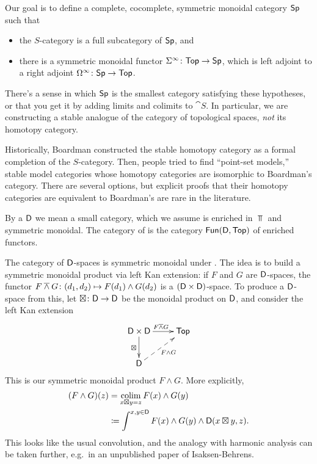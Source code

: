 Our goal is to define a complete, cocomplete, symmetric monoidal category $\mathsf{Sp}$ such that
\begin{itemize}
	\item the $S$-category is a full subcategory of $\mathsf{Sp}$, and
	\item there is a symmetric monoidal functor $\Sigma^\infty\colon\mathsf{Top}\to\mathsf{Sp}$, which is left adjoint to a right
	adjoint $\Omega^\infty\colon\mathsf{Sp}\to\mathsf{Top}$.
\end{itemize}
There's a sense in which $\mathsf{Sp}$ is the smallest category satisfying these hypotheses, or that you get it by adding
limits and colimits to $\cat S$. In particular, we are constructing a stable analogue of the category of
topological spaces, \emph{not} its homotopy category.
\begin{rem}
Historically, Boardman constructed the stable homotopy category as a formal completion of the $S$-category. Then,
people tried to find ``point-set models,'' stable model categories whose homotopy categories are isomorphic to
Boardman's category. There are several options, but explicit proofs that their homotopy categories are equivalent to
Boardman's are rare in the literature.
\end{rem}
\begin{defn}
By a  $\mathsf D$ we mean a small category, which we assume is enriched in $\Top$ and symmetric monoidal.
The category of  is the category $\mathsf{Fun}(\mathsf D,\mathsf{Top})$ of enriched functors.
\end{defn}
The category of $\mathsf D$-spaces is symmetric monoidal under . The idea is to build a symmetric
monoidal product via left Kan extension: if $F$ and $G$ are $\mathsf D$-spaces, the functor $F\overwedge
G\colon(d_1,d_2)\mapsto F(d_1)\wedge G(d_2)$ is a $(\mathsf D\times\mathsf D)$-space. To produce a $\mathsf D$-space from this, let
$\boxtimes\colon\mathsf D\to\mathsf D$ be the monoidal product on $\mathsf D$, and consider the left Kan extension
\[\xymatrix{
	\fD\times\fD\ar[r]^{F\overwedge G}\ar[d]_\boxtimes & \Top\\
	\fD\ar@{-->}[ur]_{F\wedge G}
}\]
This is our symmetric monoidal product $F\wedge G$. More explicitly,
\begin{align*}
( F\wedge G)(z) &= \operatorname*{colim}_{x\boxtimes y = z} F(x)\wedge G(y)\\
								&\coloneqq \int^{x, y\in \mathsf D} F(x) \wedge G(y) \wedge \mathsf D(x\boxtimes y, z).
\end{align*}
This looks like the usual convolution, and the analogy with harmonic analysis can be taken further, e.g.\ in an
unpublished paper of Isaksen-Behrens.

